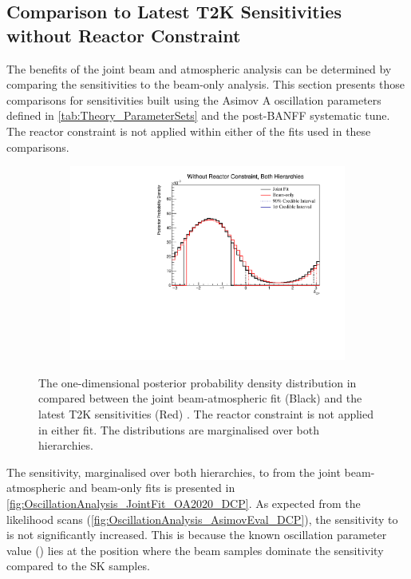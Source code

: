 \clearpage
\subsection{Comparison to Latest T2K Sensitivities without Reactor Constraint}
\label{sec:OscillationAnalysis_JointFit_OA2020}

The benefits of the joint beam and atmospheric analysis can be determined by comparing the sensitivities to the beam-only analysis. This section presents those comparisons for sensitivities built using the Asimov A oscillation parameters defined in \autoref{tab:Theory_ParameterSets} and the post-BANFF systematic tune. The reactor constraint is not applied within either of the fits used in these comparisons.

\begin{figure}[h]
  \begin{subfigure}[t]{0.98\textwidth}
    \includegraphics[width=\textwidth, trim={0mm 0mm 0mm 0mm}, clip,page=1]{Figures/OA/JointFit_OA2020_Comp/ContourComparison_1D_dcp_BH_2_woRC_UnSmeared_CredibleInterval.pdf}
  \end{subfigure}
  \caption{The one-dimensional posterior probability density distribution in  compared between the joint beam-atmospheric fit (Black) and the latest T2K sensitivities (Red) \cite{Dunne2020-uf, t2k_tn_393}. The reactor constraint is not applied in either fit. The distributions are marginalised over both hierarchies.}
  \label{fig:OscillationAnalysis_JointFit_OA2020_DCP}
\end{figure}

The sensitivity, marginalised over both hierarchies, to  from the joint beam-atmospheric and beam-only fits is presented in \autoref{fig:OscillationAnalysis_JointFit_OA2020_DCP}. As expected from the likelihood scans (\autoref{fig:OscillationAnalysis_AsimovEval_DCP}), the sensitivity to  is not significantly increased. This is because the known oscillation parameter value () lies at the position where the beam samples dominate the sensitivity compared to the SK samples.

